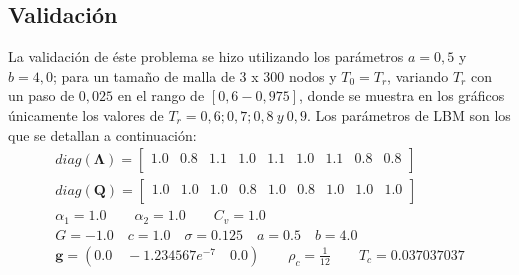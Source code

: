 %



\subsection{Validación}

La validación de éste problema se hizo utilizando los parámetros $a =0,5$ y $b = 4,0$; para un tamaño de malla de 3 x 300 nodos y $T_0 = T_r$, variando $T_r$ con un paso de $0,025$ en el rango de $[0,6 - 0,975]$, donde se muestra en los gráficos únicamente los valores de $T_r = 0,6 ; 0,7 ; 0,8 \> y \> 0,9$.  Los parámetros de LBM son los que se detallan a continuación:
\begin{align*}
diag(\mathbf{\Lambda}) = 
\begin{bmatrix}
1.0 & 0.8 & 1.1 & 1.0 & 1.1 & 1.0 & 1.1 & 0.8 & 0.8 \\
\end{bmatrix}\\
diag(\mathbf{Q}) = 
\begin{bmatrix}
1.0 & 1.0 & 1.0 & 0.8 & 1.0 & 0.8 & 1.0 & 1.0 & 1.0 \\
\end{bmatrix}\\
\alpha_{1} = 1.0 \qquad 	\alpha_{2} = 1.0 \qquad C_{v} = 1.0\\
G = -1.0 \quad c = 1.0 \quad \sigma = 0.125 \quad a = 0.5 \quad b = 4.0 \\
\mathbf{g} = (0.0 \quad-1.234567e^{-7}\quad 0.0 ) \qquad \rho_c = \frac{1}{12} \qquad T_c = 0.037037037
\end{align*}


